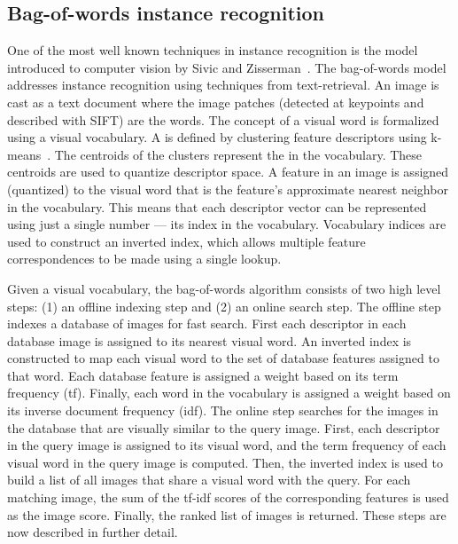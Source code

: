     \subsection{Bag-of-words instance recognition}\label{subsec:bow}

        One of the most well known techniques in instance recognition
          is the  model introduced to computer
          vision by Sivic and Zisserman~\cite{sivic_video_2003,
          sivic_efficient_2009}.
        The bag-of-words model addresses instance recognition using
          techniques from text-retrieval.
        An image is cast as a text document where the image patches
          (detected at keypoints and described with SIFT) are the words.
        The concept of a visual word is formalized using a visual
          vocabulary.
        A  is defined by clustering
          feature descriptors using k-means~\cite{lloyd_least_1982}.
        The centroids of the clusters represent the  in the vocabulary.
        These centroids are used to quantize descriptor space.
        A feature in an image is assigned (quantized) to the visual
          word that is the feature's approximate nearest neighbor in the
          vocabulary.
        This means that each descriptor vector can be represented using
          just a single number --- \ie{} its index in the vocabulary.
        Vocabulary indices are used to construct an inverted index,
          which allows multiple feature correspondences to be made using
          a single lookup.

        Given a visual vocabulary, the bag-of-words algorithm consists
          of two high level steps:
        (1) an offline indexing step and
        (2) an online search step.
        The offline step indexes a database of images for fast search.
        First each descriptor in each database image is assigned to its
          nearest visual word.
        An inverted index is constructed to map each visual word to the
          set of database features assigned to that word.
        Each database feature is assigned a weight based on its term
          frequency (tf).
        Finally, each word in the vocabulary is assigned a weight based
          on its inverse document frequency (idf).
        The online step searches for the images in the database that
          are visually similar to the query image.
        First, each descriptor in the query image is assigned to its
          visual word, and the term frequency of each visual word in the
          query image is computed.
        Then, the inverted index is used to build a list of all images
          that share a visual word with the query.
        For each matching image, the sum of the tf-idf scores of the
          corresponding features is used as the image score.
        Finally, the ranked list of images is returned.
        These steps are now described in further detail.

